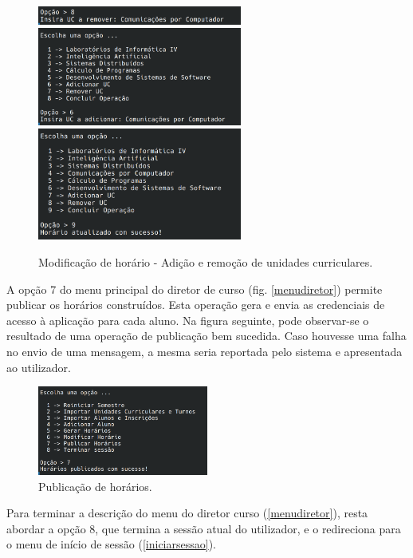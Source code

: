 \documentclass[12pt, a4paper]{article}
\begin{document}
\begin{figure}[H]
    \centering
    \includegraphics[width=0.6\textwidth]{Imagens/Manual/DiretorCurso-6-2.png}
    \includegraphics[width=0.6\textwidth]{Imagens/Manual/DiretorCurso-6-3.png}
    \includegraphics[width=0.6\textwidth]{Imagens/Manual/DiretorCurso-6-4.png}
    \caption{Modificação de horário - Adição e remoção de unidades curriculares.}
\end{figure}

A opção 7 do menu principal do diretor de curso (fig. \ref{menudiretor}) permite publicar os
horários construídos. Esta operação gera e envia as credenciais de acesso à aplicação para cada
aluno. Na figura seguinte, pode observar-se o resultado de uma operação de publicação bem sucedida.
Caso houvesse uma falha no envio de uma mensagem, a mesma seria reportada pelo sistema e apresentada
ao utilizador.

\begin{figure}[H]
    \centering
    \includegraphics[width=0.5\textwidth]{Imagens/Manual/DiretorCurso-7.png}
    \caption{Publicação de horários.}
\end{figure}

Para terminar a descrição do menu do diretor curso (\ref{menudiretor}), resta abordar a opção 8, que
termina a sessão atual do utilizador, e o redireciona para o menu de início de sessão
(\ref{iniciarsessao}).
\end{document}
